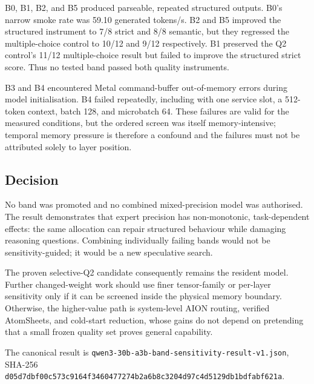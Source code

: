 B0, B1, B2, and B5 produced parseable, repeated structured outputs.  B0's
narrow smoke rate was 59.10 generated tokens/s.  B2 and B5 improved the
structured instrument to 7/8 strict and 8/8 semantic, but they regressed the
multiple-choice control to 10/12 and 9/12 respectively.  B1 preserved the Q2
control's 11/12 multiple-choice result but failed to improve the structured
strict score.  Thus no tested band passed both quality instruments.

B3 and B4 encountered Metal command-buffer out-of-memory errors during model
initialisation.  B4 failed repeatedly, including with one service slot, a
512-token context, batch 128, and microbatch 64.  These failures are valid for
the measured conditions, but the ordered screen was itself memory-intensive;
temporal memory pressure is therefore a confound and the failures must not be
attributed solely to layer position.

\subsection{Decision}

No band was promoted and no combined mixed-precision model was authorised.
The result demonstrates that expert precision has non-monotonic,
task-dependent effects: the same allocation can repair structured behaviour
while damaging reasoning questions.  Combining individually failing bands
would not be sensitivity-guided; it would be a new speculative search.

The proven selective-Q2 candidate consequently remains the resident model.
Further changed-weight work should use finer tensor-family or per-layer
sensitivity only if it can be screened inside the physical memory boundary.
Otherwise, the higher-value path is system-level AION routing, verified
AtomSheets, and cold-start reduction, whose gains do not depend on pretending
that a small frozen quality set proves general capability.

The canonical result is
\texttt{qwen3-30b-a3b-band-sensitivity-result-v1.json}, SHA-256
\texttt{d05d7dbf00c573c9164f3460477274b2a6b8c3204d97c4d5129db1bdfabf621a}.
